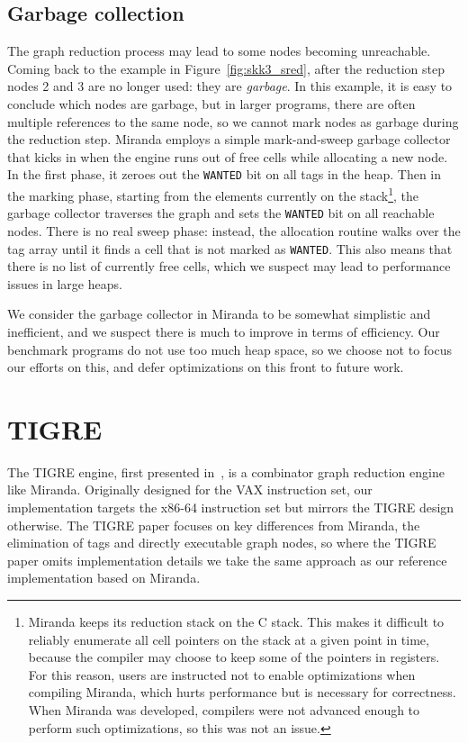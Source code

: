 \documentclass[conference]{IEEEtran}
\begin{document}
\subsection{Garbage collection}
\label{sec:gc}
The graph reduction process may lead to some nodes becoming unreachable.
Coming back to the example in Figure~\ref{fig:skk3_sred}, after the reduction step nodes 2 and 3 are no longer used: they are \textit{garbage}.
In this example, it is easy to conclude which nodes are garbage, but in larger programs, there are often multiple references to the same node, so we cannot mark nodes as garbage during the reduction step.
Miranda employs a simple mark-and-sweep garbage collector that kicks in when the engine runs out of free cells while allocating a new node.
In the first phase, it zeroes out the \texttt{WANTED} bit on all tags in the heap.
Then in the marking phase, starting from the elements currently on the stack\footnote{
    Miranda keeps its reduction stack on the C stack.
    This makes it difficult to reliably enumerate all cell pointers on the stack at a given point in time, because the compiler may choose to keep some of the pointers in registers.
    For this reason, users are instructed not to enable optimizations when compiling Miranda, which hurts performance but is necessary for correctness.
    When Miranda was developed, compilers were not advanced enough to perform such optimizations, so this was not an issue.
}, the garbage collector traverses the graph and sets the \texttt{WANTED} bit on all reachable nodes.
There is no real sweep phase: instead, the allocation routine walks over the tag array until it finds a cell that is not marked as \texttt{WANTED}.
This also means that there is no list of currently free cells, which we suspect may lead to performance issues in large heaps.

We consider the garbage collector in Miranda to be somewhat simplistic and inefficient, and we suspect there is much to improve in terms of efficiency.
Our benchmark programs do not use too much heap space, so we choose not to focus our efforts on this, and defer optimizations on this front to future work.

\section{TIGRE}
\label{sec:tigre}
The TIGRE engine, first presented in~\cite{koopman_fresh_1989}, is a combinator graph reduction engine like Miranda.
Originally designed for the VAX instruction set, our implementation targets the x86-64 instruction set but mirrors the TIGRE design otherwise.
The TIGRE paper focuses on key differences from Miranda, the elimination of tags and directly executable graph nodes, so where the TIGRE paper omits implementation details we take the same approach as our reference implementation based on Miranda.
\end{document}
